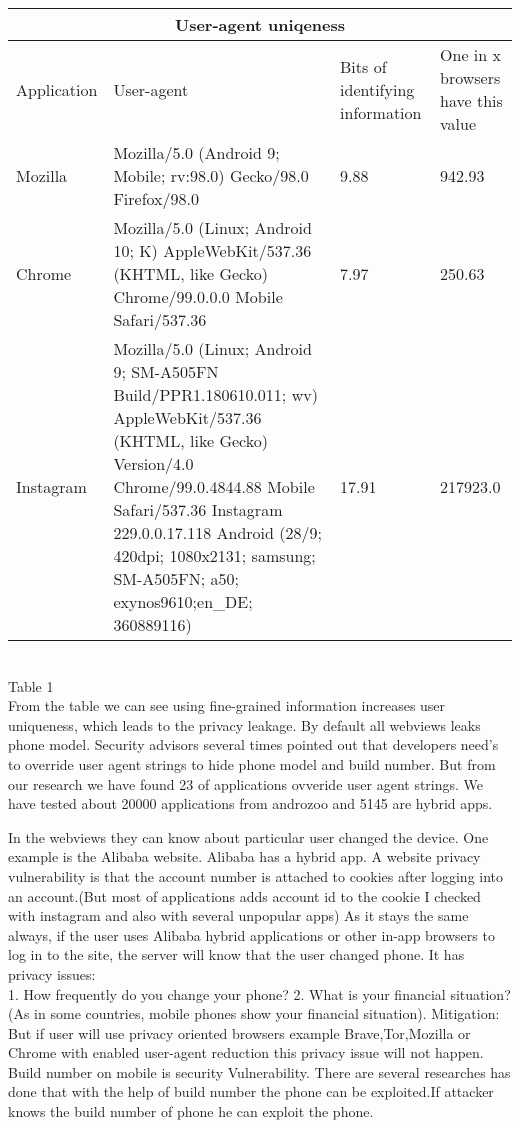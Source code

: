 \begin{tabular}{ |p{3cm}||p{5cm}|p{3cm}|p{3cm} |}
 \hline
 \multicolumn{4}{|c|}{User-agent uniqeness} \\
 \hline
Application & User-agent& Bits of identifying information& One in x browsers have this value\\
 \hline
Mozilla & Mozilla/5.0 (Android 9; Mobile; rv:98.0) Gecko/98.0 Firefox/98.0& 9.88 & 942.93\\
 \hline
Chrome & Mozilla/5.0 (Linux; Android 10; K) AppleWebKit/537.36 (KHTML, like Gecko) Chrome/99.0.0.0 Mobile Safari/537.36 & 7.97 & 250.63\\
 \hline
Instagram & Mozilla/5.0 (Linux; Android 9; SM-A505FN Build/PPR1.180610.011; wv) AppleWebKit/537.36 (KHTML, like Gecko) Version/4.0  Chrome/99.0.4844.88 Mobile Safari/537.36 Instagram 229.0.0.17.118  Android (28/9; 420dpi; 1080x2131;           samsung; SM-A505FN; a50; exynos9610;en\_DE; 360889116) &17.91 & 217923.0\\
\hline
\end{tabular}\\
  Table 1 
 \\
From the table we can see using fine-grained information increases user uniqueness, which leads to the privacy leakage.
By default all webviews leaks phone model. Security advisors several times pointed out that developers need's to override user agent strings to hide phone model and build number\cite{forum}\cite{nightwatch}\cite{nightwatch1}. But from our research we have found 23 of applications ovveride user agent strings. We have tested about 20000 applications from androzoo and 5145 are hybrid apps. 


In the webviews they can know about particular user changed the device. One example is the Alibaba website. Alibaba has a hybrid app. A website privacy vulnerability is that the account number is attached to cookies after logging into an account.(But most of applications adds account id to the cookie I checked with instagram and also with several unpopular apps) As it stays the same always, if the user uses Alibaba hybrid applications or other in-app browsers to log in to the site, the server will know that the user changed phone. It has privacy issues:\\
1. How frequently do you change your phone?
2. What is your financial situation? (As in some countries, mobile phones show your financial situation).
Mitigation:\\
But if user will use privacy oriented browsers example Brave,Tor,Mozilla or Chrome with enabled user-agent reduction this privacy issue will not happen. 
Build number on mobile is security Vulnerability. There are several researches has done that with the help of build number the phone can be exploited\cite{nightwatch02}.If attacker knows the build number of phone he can exploit the phone. 
\\

